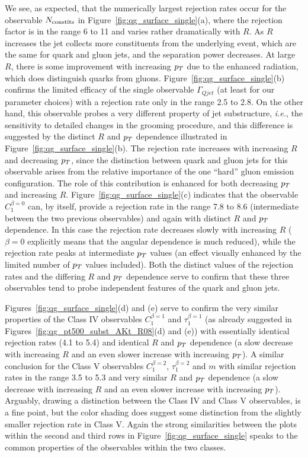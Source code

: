We see, as expected, that the numerically largest rejection rates occur
for the observable $N_{\rm constits}$ in  Figure~\ref{fig:qg_surface_single}(a), where the rejection factor is in the range 6 to 11 and 
varies rather dramatically with $R$.  As $R$ increases the jet collects more constituents from the underlying event, which are the same
for quark and gluon jets, and the separation power decreases.  At large $R$, there is some improvement with increasing $p_T$ due to the 
enhanced radiation, which does distinguish quarks from gluons.  Figure~\ref{fig:qg_surface_single}(b) confirms the limited efficacy of the single
observable $\Gamma_{Qjet}$ (at least for our parameter choices) with a rejection rate only in the range 2.5 to 2.8.  On the other hand, this 
observable probes a very different
property of jet substructure, \textit{i.e.}, the sensitivity to detailed changes in the grooming procedure, and this difference is suggested
by the distinct $R$ and $p_T$ dependence illustrated in  Figure~\ref{fig:qg_surface_single}(b).  The rejection rate increases with increasing $R$
and decreasing $p_T$, since the distinction between quark and gluon jets for this observable arises from the relative importance of the one
``hard'' gluon emission configuration.  The role of this contribution is enhanced for both decreasing $p_T$ and increasing $R$. 
Figure~\ref{fig:qg_surface_single}(c) indicates that the observable $C_1^{\beta=0}$ can, by itself, provide a rejection rate in the range
7.8 to 8.6 (intermediate between the two previous observables) and again with distinct $R$ and $p_T$ dependence.  In this case the rejection
rate decreases slowly with increasing $R$ ($\beta = 0$ explicitly means that the angular dependence is much reduced), 
while the rejection rate peaks at intermediate $p_T$ values (an effect visually enhanced by the limited number of 
$p_T$ values included).  Both the distinct values of the rejection rates and the differing $R$ and $p_T$ dependence serve to confirm that these three
observables tend to probe independent features of the quark and gluon jets.  

Figures~\ref{fig:qg_surface_single}(d) and (e) serve to confirm
the very similar properties of the Class IV observables $C_1^{\beta=1}$ and $\tau_1^{\beta=1}$ (as already suggested in
Figures~\ref{fig:qg_pt500_subst_AKt_R08}(d) and (e))
with essentially identical rejection rates (4.1 to 5.4) and identical $R$ and $p_T$ dependence (a slow decrease with increasing $R$ and an even
slower increase with increasing $p_T$).  
A similar conclusion for the Class V observables $C_1^{\beta=2}$, $\tau_1^{\beta=2}$ and $m$ with similar rejection rates in the 
range 3.5 to 5.3 and very similar $R$ and $p_T$ dependence (a slow decrease with increasing $R$ and an even
slower increase with increasing $p_T$).  Arguably, drawing a distinction between the Class IV and Class V observables, is a fine point, 
but the color shading does suggest some
distinction from the slightly smaller rejection rate in Class V.  Again the strong similarities between the plots within the second and third rows in 
Figure~\ref{fig:qg_surface_single} speaks to the common properties of the observables within the two classes.


